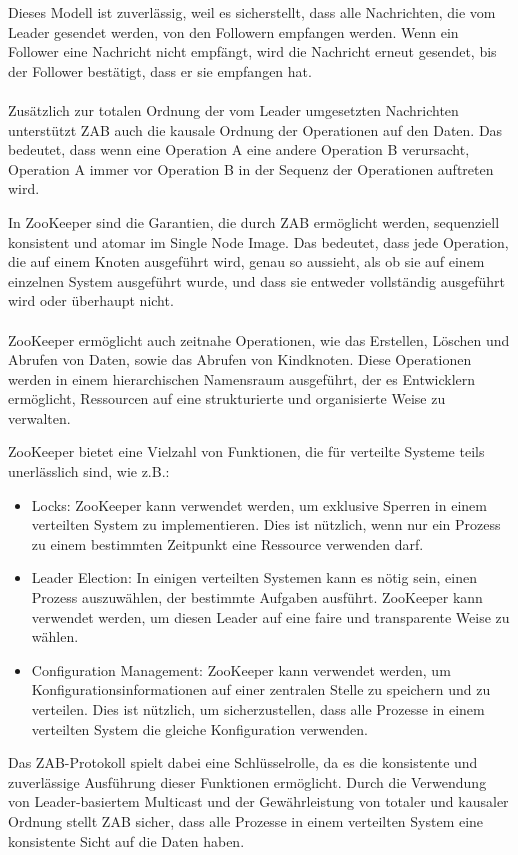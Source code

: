 Dieses Modell ist zuverlässig, weil es sicherstellt, dass alle Nachrichten, die vom Leader gesendet werden, von den Followern empfangen werden. Wenn ein Follower eine Nachricht nicht empfängt, wird die Nachricht erneut gesendet, bis der Follower bestätigt, dass er sie empfangen hat.
\\\\
Zusätzlich zur totalen Ordnung der vom Leader umgesetzten Nachrichten  unterstützt ZAB auch die kausale Ordnung der Operationen auf den Daten. Das bedeutet, dass wenn eine Operation A eine andere Operation B verursacht, Operation A immer vor Operation B in der Sequenz der Operationen auftreten wird.

In ZooKeeper sind die Garantien, die durch ZAB ermöglicht werden, sequenziell konsistent und atomar im Single Node Image. Das bedeutet, dass jede Operation, die auf einem Knoten ausgeführt wird, genau so aussieht, als ob sie auf einem einzelnen System ausgeführt wurde, und dass sie entweder vollständig ausgeführt wird oder überhaupt nicht.
\\\\
ZooKeeper ermöglicht auch zeitnahe Operationen, wie das Erstellen, Löschen und Abrufen von Daten, sowie das Abrufen von Kindknoten. Diese Operationen werden in einem hierarchischen Namensraum ausgeführt, der es Entwicklern ermöglicht, Ressourcen auf eine strukturierte und organisierte Weise zu verwalten.

ZooKeeper bietet eine Vielzahl von Funktionen, die für verteilte Systeme teils unerlässlich sind, wie z.B.:
\begin{itemize}
\item Locks: ZooKeeper kann verwendet werden, um exklusive Sperren in einem verteilten System zu implementieren. Dies ist nützlich, wenn nur ein Prozess zu einem bestimmten Zeitpunkt eine Ressource verwenden darf.
\item Leader Election: In einigen verteilten Systemen kann es nötig sein, einen Prozess auszuwählen, der bestimmte Aufgaben ausführt. ZooKeeper kann verwendet werden, um diesen Leader auf eine faire und transparente Weise zu wählen.
\item Configuration Management: ZooKeeper kann verwendet werden, um Konfigurationsinformationen auf einer zentralen Stelle zu speichern und zu verteilen. Dies ist nützlich, um sicherzustellen, dass alle Prozesse in einem verteilten System die gleiche Konfiguration verwenden.
\end{itemize}
Das ZAB-Protokoll spielt dabei eine Schlüsselrolle, da es die konsistente und zuverlässige Ausführung dieser Funktionen ermöglicht. Durch die Verwendung von Leader-basiertem Multicast und der Gewährleistung von totaler und kausaler Ordnung stellt ZAB sicher, dass alle Prozesse in einem verteilten System eine konsistente Sicht auf die Daten haben.

